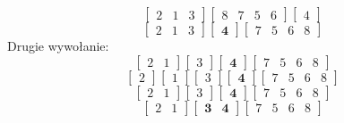 \documentclass[10pt, oneside]{article}
\theoremstyle{remark}
\begin{document}
$$\begin{bmatrix} 2 & 1 & 3 \end{bmatrix} \begin{bmatrix} 8 & 7 & 5 & 6 \end{bmatrix} \begin{bmatrix} 4 \end{bmatrix}$$
$$\begin{bmatrix} 2 & 1 & 3 \end{bmatrix} \begin{bmatrix} \mathbf{4} \end{bmatrix} \begin{bmatrix} 7 & 5 & 6 & 8 \end{bmatrix}$$
Drugie wywołanie:
$$\begin{bmatrix} 2 & 1 \end{bmatrix} \begin{bmatrix}  3 \end{bmatrix} \begin{bmatrix} \mathbf{4} \end{bmatrix} \begin{bmatrix} 7 & 5 & 6 & 8 \end{bmatrix}$$
$$\begin{bmatrix} 2 \end{bmatrix} \begin{bmatrix}  1 \end{bmatrix} \begin{bmatrix}  3 \end{bmatrix} \begin{bmatrix} \mathbf{4}  \end{bmatrix} \begin{bmatrix} 7 & 5 & 6 & 8 \end{bmatrix}$$
$$\begin{bmatrix} 2 & 1 \end{bmatrix} \begin{bmatrix}  3 \end{bmatrix} \begin{bmatrix} \mathbf{4}  \end{bmatrix} \begin{bmatrix} 7 & 5 & 6 & 8 \end{bmatrix}$$
$$\begin{bmatrix} 2 & 1 \end{bmatrix} \begin{bmatrix}  \mathbf{3} & \mathbf{4}  \end{bmatrix} \begin{bmatrix} 7 & 5 & 6 & 8 \end{bmatrix}$$
\end{document}
